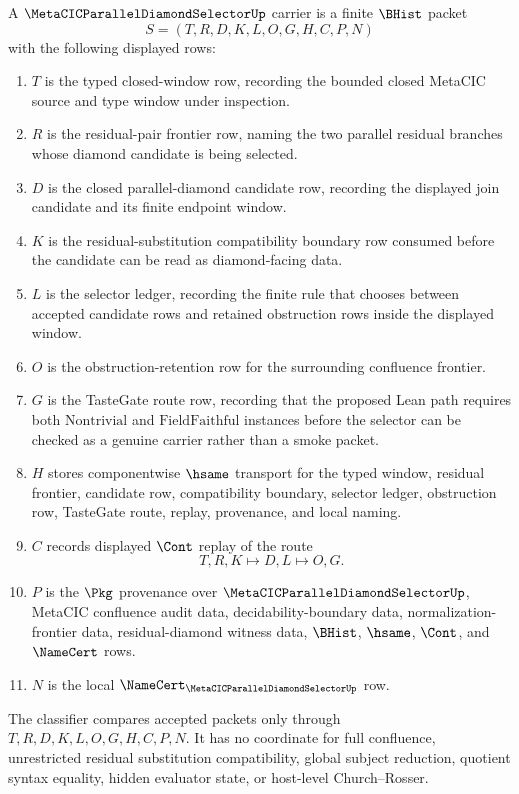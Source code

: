 \begin{definition}
\label{def:metacic-parallel-diamond-selector-carrier}
A $\MetaCICParallelDiamondSelectorUp$ carrier is a finite $\BHist$ packet
$$
S=(T,R,D,K,L,O,G,H,C,P,N)
$$
with the following displayed rows:
\begin{enumerate}
\item $T$ is the typed closed-window row, recording the bounded closed MetaCIC source and type window under inspection.
\item $R$ is the residual-pair frontier row, naming the two parallel residual branches whose diamond candidate is being selected.
\item $D$ is the closed parallel-diamond candidate row, recording the displayed join candidate and its finite endpoint window.
\item $K$ is the residual-substitution compatibility boundary row consumed before the candidate can be read as diamond-facing data.
\item $L$ is the selector ledger, recording the finite rule that chooses between accepted candidate rows and retained obstruction rows inside the displayed window.
\item $O$ is the obstruction-retention row for the surrounding confluence frontier.
\item $G$ is the TasteGate route row, recording that the proposed Lean path requires both $\mathrm{Nontrivial}$ and $\mathrm{FieldFaithful}$ instances before the selector can be checked as a genuine carrier rather than a smoke packet.
\item $H$ stores componentwise $\hsame$ transport for the typed window, residual frontier, candidate row, compatibility boundary, selector ledger, obstruction row, TasteGate route, replay, provenance, and local naming.
\item $C$ records displayed $\Cont$ replay of the route
$$
T,R,K \longmapsto D,L \longmapsto O,G .
$$
\item $P$ is the $\Pkg$ provenance over $\MetaCICParallelDiamondSelectorUp$, MetaCIC confluence audit data, decidability-boundary data, normalization-frontier data, residual-diamond witness data, $\BHist$, $\hsame$, $\Cont$, and $\NameCert$ rows.
\item $N$ is the local $\NameCert_{\MetaCICParallelDiamondSelectorUp}$ row.
\end{enumerate}
The classifier compares accepted packets only through $T,R,D,K,L,O,G,H,C,P,N$. It has no coordinate for full confluence, unrestricted residual substitution compatibility, global subject reduction, quotient syntax equality, hidden evaluator state, or host-level Church--Rosser.
\end{definition}


